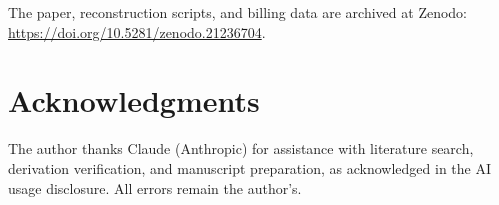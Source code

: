 \documentclass[11pt]{article}
\theoremstyle{definition}
\theoremstyle{remark}
\begin{document}
\smallskip
\noindent The paper, reconstruction scripts, and billing data are archived at Zenodo: \url{https://doi.org/10.5281/zenodo.21236704}.

\section*{Acknowledgments}

The author thanks Claude (Anthropic) for assistance with literature search, derivation verification, and manuscript preparation, as acknowledged in the AI usage disclosure. All errors remain the author's.


\end{document}
